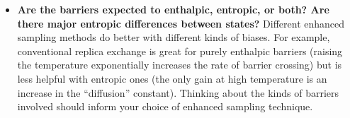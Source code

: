 \begin{itemize}
    \item \textbf{Are the barriers expected to enthalpic, entropic, or both? Are
    there major entropic differences between states?}  Different enhanced
    sampling methods do better with different kinds of biases.  For example,
    conventional replica exchange is great for purely enthalpic barriers
    (raising the temperature exponentially increases the rate of barrier
    crossing) but is less helpful with entropic ones (the only gain at high
    temperature is an increase in the ``diffusion'' constant).  Thinking about
    the kinds of barriers involved should inform your choice of enhanced
    sampling technique.

\end{itemize}
